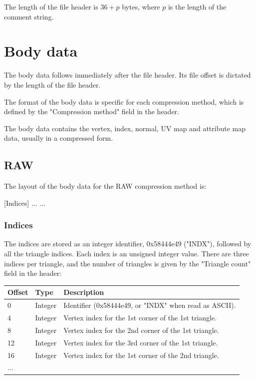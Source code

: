 The length of the file header is $36+p$ bytes, where $p$ is the length of the
comment string.



\chapter{Body data}
The body data follows immediately after the file header. Its file offset is
dictated by the length of the file header.

The format of the body data is specific for each compression method, which is
defined by the "Compression method" field in the header.

The body data contains the vertex, index, normal, UV map and attribute map
data, usually in a compressed form.


\section{RAW}
The layout of the body data for the RAW compression method is:

[Indices]\newline
[Vertices]\newline
[Normals]\newline
[UV Map 0]\newline
[UV Map 1]\newline
...\newline
[UV Map N]\newline
...

\subsection{Indices}
The indices are stored as an integer identifier, 0x58444e49 ("INDX"), followed
by all the triangle indices. Each index is an unsigned integer value. There are
three indices per triangle, and the number of triangles is given by the
"Triangle count" field in the header:

\begin{tabular}{|l|l|l|}\hline
\textbf{Offset} &  \textbf{Type} & \textbf{Description}\\ \hline
0 & Integer & Identifier (0x58444e49, or "INDX" when read as ASCII).\\ \hline
4 & Integer & Vertex index for the 1st corner of the 1st triangle.\\ \hline
8 & Integer & Vertex index for the 2nd corner of the 1st triangle.\\ \hline
12 & Integer & Vertex index for the 3rd corner of the 1st triangle.\\ \hline
16 & Integer & Vertex index for the 1st corner of the 2nd triangle.\\ \hline
... & & \\ \hline
\end{tabular}

